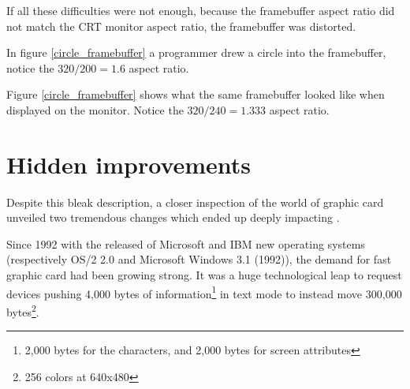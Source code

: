 \par
{} \label{vga_ratio}
\par
If all these difficulties were not enough, because the framebuffer aspect ratio did not match the CRT monitor aspect ratio, the framebuffer was distorted.\\
\par
{}
\par
In figure \ref{circle_framebuffer} a programmer drew a circle into the framebuffer, notice the $ 320/200 = 1.6 $ aspect ratio.
\par
{}
\par
Figure \ref{circle_framebuffer} shows what the same framebuffer looked like when displayed on the monitor. Notice the $ 320/240 = 1.333 $ aspect ratio.\\







\section{Hidden improvements}
Despite this bleak description, a closer inspection of the world of graphic card unveiled two tremendous changes which ended up deeply impacting \doom. \\
\par
Since 1992 with the released of Microsoft and IBM new operating systems (respectively OS/2 2.0 and Microsoft Windows 3.1 (1992)), the demand for fast graphic card had been growing strong. It was a huge technological leap to request devices pushing 4,000 bytes of information\footnote{2,000 bytes for the characters, and 2,000 bytes for screen attributes} in text mode to instead move 300,000 bytes\footnote{256 colors at 640x480}.\\
\par




